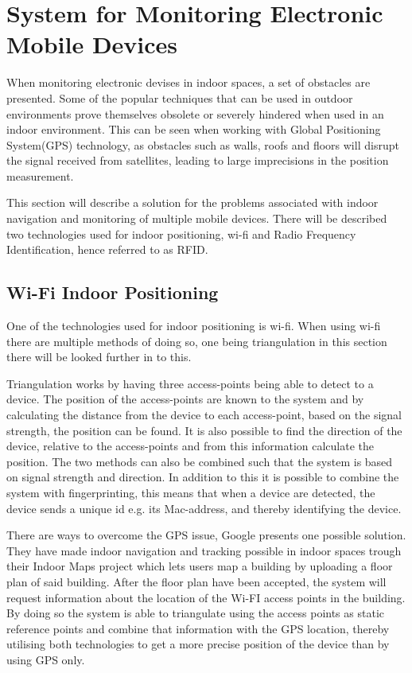 \section{System for Monitoring Electronic Mobile Devices}\label{sec:monitoring}
When monitoring electronic devises in indoor spaces, a set of obstacles are presented. Some of the popular techniques that can be used in outdoor environments prove themselves obsolete or severely hindered when used in an indoor environment. This can be seen when working with Global Positioning System(GPS) technology, as obstacles such as walls, roofs and floors will disrupt the signal received from satellites, leading to large imprecisions in the position measurement.

This section will describe a solution for the problems associated with indoor navigation and monitoring of multiple mobile devices. There will be described two technologies used for indoor positioning, wi-fi and Radio Frequency Identification, hence referred to as RFID.

\subsection{Wi-Fi Indoor Positioning}
One of the technologies used for indoor positioning is wi-fi. When using wi-fi there are multiple methods of doing so, one being triangulation in this section there will be looked further in to this.

Triangulation works by having three access-points being able to detect to a device. The position of the access-points are known to the system and by calculating the distance from the device to each access-point, based on the signal strength, the position can be found. It is also possible to find the direction of the device, relative to the access-points and from this information calculate the position. The two methods can also be combined such that the system is based on signal strength and direction. In addition to this it is possible to combine the system with fingerprinting, this means that when a device are detected, the device sends a unique id e.g. its Mac-address, and thereby identifying the device\cite{triang_n_finger}.

There are ways to overcome the GPS issue, Google presents one possible solution. They have made indoor navigation and tracking possible in indoor spaces trough their Indoor Maps project \cite{IPSoverGPS} which lets users map a building by uploading a floor plan of said building. After the floor plan have been accepted, the system will request information about the location of the Wi-FI access points in the building. By doing so the system is able to triangulate using the access points as static reference points and combine that information with the GPS location, thereby utilising both technologies to get a more precise position of the device than by using GPS only.


